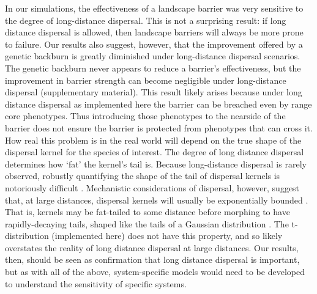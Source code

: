 \documentclass{article}
\begin{document}
In our simulations, the effectiveness of a landscape barrier was very sensitive to the degree of long-distance dispersal.  This is not a surprising result: if long distance dispersal is allowed, then landscape barriers will always be more prone to failure.  Our results also suggest, however, that the improvement offered by a genetic backburn is greatly diminished under long-distance dispersal scenarios.  The genetic backburn never appears to reduce a barrier's effectiveness, but the improvement in barrier strength can become negligible under long-distance dispersal (supplementary material).  This result likely arises because under long distance dispersal as implemented here the barrier can be breached even by range core phenotypes.  Thus introducing those phenotypes to the nearside of the barrier does not ensure the barrier is protected from phenotypes that can cross it.  How real this problem is in the real world will depend on the true shape of the dispersal kernel for the species of interest.  The degree of long distance dispersal determines how `fat' the kernel's tail is.  Because long-distance dispersal is rarely observed, robustly quantifying the shape of the tail of dispersal kernels is notoriously difficult \citep[e.g.,][]{Clark1998a}.  Mechanistic considerations of dispersal, however, suggest that, at large distances, dispersal kernels will usually be exponentially bounded \citep{Petrovskii2009a}.  That is, kernels may be fat-tailed to some distance before morphing to have rapidly-decaying tails, shaped like the tails of a Gaussian distribution \citep{Petrovskii2009a}.  The t-distribution (implemented here) does not have this property, and so likely overstates the reality of long distance dispersal at large distances.  Our results, then, should be seen as confirmation that long distance dispersal is important, but as with all of the above, system-specific models would need to be developed to understand the sensitivity of specific systems.
\end{document}
